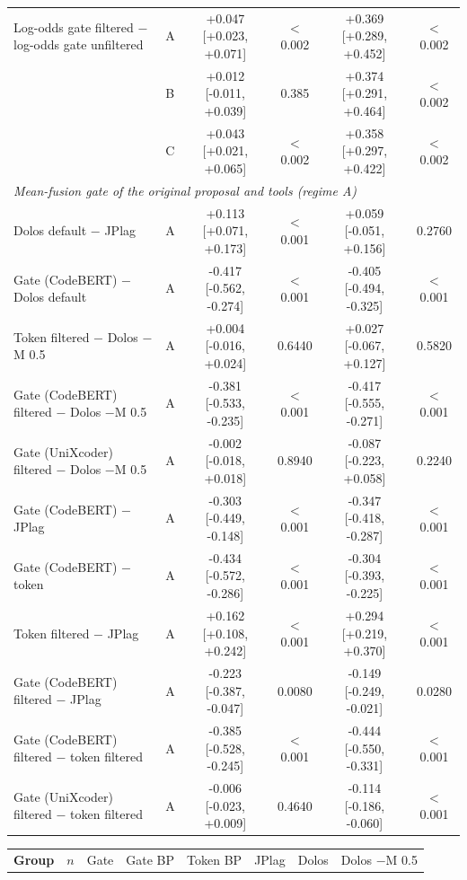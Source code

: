 \begin{table}[t]
\begin{tabular}{ll|cc|cc}
\midrule
Log-odds gate filtered $-$ log-odds gate unfiltered & A & +0.047 [+0.023, +0.071] & $<$0.002 & +0.369 [+0.289, +0.452] & $<$0.002 \\
 & B & +0.012 [-0.011, +0.039] & 0.385 & +0.374 [+0.291, +0.464] & $<$0.002 \\
 & C & +0.043 [+0.021, +0.065] & $<$0.002 & +0.358 [+0.297, +0.422] & $<$0.002 \\
\midrule
\multicolumn{6}{l}{\emph{Mean-fusion gate of the original proposal and tools (regime A)}} \\
Dolos default $-$ JPlag & A & +0.113 [+0.071, +0.173] & $<$0.001 & +0.059 [-0.051, +0.156] & 0.2760 \\
Gate (CodeBERT) $-$ Dolos default & A & -0.417 [-0.562, -0.274] & $<$0.001 & -0.405 [-0.494, -0.325] & $<$0.001 \\
Token filtered $-$ Dolos $-$M 0.5 & A & +0.004 [-0.016, +0.024] & 0.6440 & +0.027 [-0.067, +0.127] & 0.5820 \\
Gate (CodeBERT) filtered $-$ Dolos $-$M 0.5 & A & -0.381 [-0.533, -0.235] & $<$0.001 & -0.417 [-0.555, -0.271] & $<$0.001 \\
Gate (UniXcoder) filtered $-$ Dolos $-$M 0.5 & A & -0.002 [-0.018, +0.018] & 0.8940 & -0.087 [-0.223, +0.058] & 0.2240 \\
Gate (CodeBERT) $-$ JPlag & A & -0.303 [-0.449, -0.148] & $<$0.001 & -0.347 [-0.418, -0.287] & $<$0.001 \\
Gate (CodeBERT) $-$ token & A & -0.434 [-0.572, -0.286] & $<$0.001 & -0.304 [-0.393, -0.225] & $<$0.001 \\
Token filtered $-$ JPlag & A & +0.162 [+0.108, +0.242] & $<$0.001 & +0.294 [+0.219, +0.370] & $<$0.001 \\
Gate (CodeBERT) filtered $-$ JPlag & A & -0.223 [-0.387, -0.047] & 0.0080 & -0.149 [-0.249, -0.021] & 0.0280 \\
Gate (CodeBERT) filtered $-$ token filtered & A & -0.385 [-0.528, -0.245] & $<$0.001 & -0.444 [-0.550, -0.331] & $<$0.001 \\
Gate (UniXcoder) filtered $-$ token filtered & A & -0.006 [-0.023, +0.009] & 0.4640 & -0.114 [-0.186, -0.060] & $<$0.001 \\
\bottomrule
\end{tabular}
\par\vspace{4pt}
\begin{tabular}{lr|cccccc}
\toprule
\textbf{Group} & $n$ & Gate & Gate BP & Token BP & JPlag & Dolos & Dolos $-$M 0.5 \\

\end{tabular}
\end{table}
